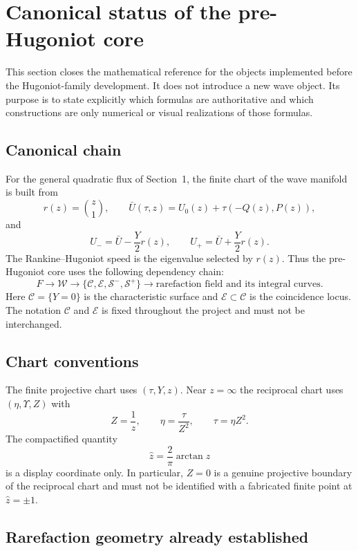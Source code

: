 \section{Canonical status of the pre-Hugoniot core}
\label{sec:canonical-status}

This section closes the mathematical reference for the objects implemented before the
Hugoniot-family development.  It does not introduce a new wave object.  Its purpose is
to state explicitly which formulas are authoritative and which constructions are only
numerical or visual realizations of those formulas.

\subsection{Canonical chain}

For the general quadratic flux of Section~1, the finite chart of the wave manifold is
built from
\[
 r(z)=\binom z1,\qquad
 \bar U(\tau,z)=U_0(z)+\tau(-Q(z),P(z)),
\]
and
\[
 U_-=\bar U-\frac Y2r(z),\qquad
 U_+=\bar U+\frac Y2r(z).
\]
The Rankine--Hugoniot speed is the eigenvalue selected by $r(z)$.  Thus the
pre-Hugoniot core uses the following dependency chain:
\[
 \boxed{
 F\longrightarrow\mathcal W\longrightarrow
 \{\mathcal C,\mathcal E,\mathcal S^-,\mathcal S^+\}
 \longrightarrow\text{rarefaction field and its integral curves}.
 }
\]
Here $\mathcal C=\{Y=0\}$ is the characteristic surface and
$\mathcal E\subset\mathcal C$ is the coincidence locus.  The notation $\mathcal C$
and $\mathcal E$ is fixed throughout the project and must not be interchanged.

\subsection{Chart conventions}

The finite projective chart uses $(\tau,Y,z)$.  Near $z=\infty$ the reciprocal chart
uses $(\eta,\Upsilon,Z)$ with
\[
 Z=\frac1z,\qquad \eta=\frac{\tau}{Z^2},\qquad \tau=\eta Z^2.
\]
The compactified quantity
\[
 \widehat z=\frac2\pi\arctan z
\]
is a display coordinate only.  In particular, $Z=0$ is a genuine projective boundary
of the reciprocal chart and must not be identified with a fabricated finite point at
$\widehat z=\pm1$.

\subsection{Rarefaction geometry already established}

